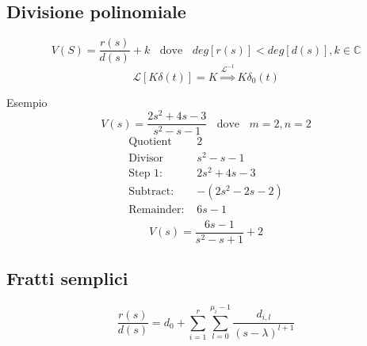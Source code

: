 \documentclass[a4paper]{article}
\theoremstyle{definition}
\theoremstyle{remark}
\begin{document}
\subsection{Divisione polinomiale}
\[V(S) = \frac{r(s)}{d(s)} + k \; \; \text{    dove    } \; \; deg[r(s)] < deg[d(s)], k \in \mathbb{C}\]
 \[\mathcal{L}[K\delta(t)] = K \stackrel{\mathcal{L}^{-1}}{\Longrightarrow} K\delta_0(t)\]
\begin{examplebox}{Esempio}
    \[V(s) = \frac{2s^2 + 4s - 3}{s^2 - s - 1} \; \; \text{ dove } \; \; m = 2, n=2\]
    \[
    \begin{array}{r|l}
    \text{Quotient} & 2 \\ \hline
    \text{Divisor} & s^2 - s - 1 \\
    \text{Step 1: } & 2s^2 + 4s - 3 \\
    \text{Subtract: } & -(2s^2 - 2s - 2) \\
    \text{Remainder: } & 6s - 1 \\
    \end{array}
    \]
    \[V(s) = \frac{6s - 1}{s^2 - s + 1} + 2\]
\end{examplebox}

\subsection{Fratti semplici}

\[\frac{r(s)}{d(s)} =  d_0 + \sum_{i=1}^{r} \sum_{l=0}^{\mu_i - 1} \frac{d_{i,l}}{(s-\lambda)^{l+1}}  \]
\end{document}
